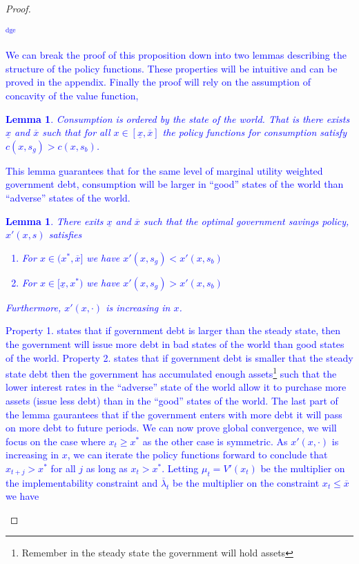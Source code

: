 \documentclass[12pt]{article}
\newcommand{\dge}[1]{\textcolor{blue}{$^{\textrm{dge}}${#1}}}
\newtheorem{lemma}[theorem]{Lemma}
\begin{document}
\begin{proof}  \dge{We can break the proof of this proposition down into two lemmas  describing the structure of the policy functions.  These properties will be intuitive and can be proved in the appendix.  Finally the proof will rely on the assumption of concavity of the value function,
\begin{lemma}\label{lem:c_order}  Consumption is ordered by the state of the world.  That is there exists $\underline x$ and $\overline x$ such that for all $x\in[\underline x,\overline x]$ the policy functions for consumption satisfy $c(x,s_g) > c(x,s_b)$.
\end{lemma}  This lemma guarantees that for the same level of marginal utility weighted government debt, consumption will be larger in ``good'' states of the world than ``adverse'' states of the world.
\begin{lemma}\label{lem:x_order}  There exits $\underline x$ and $\overline x$ such that the optimal government savings policy, $x'(x,s)$ satisfies 
\begin{enumerate}
	\item For $x\in(x^*,\overline x]$ we have $x'(x,s_g) < x'(x,s_b)$
	\item  For $x\in[\underline x, x^*)$ we have $x'(x,s_g) > x'(x,s_b)$
\end{enumerate}  Furthermore, $x'(x,\cdot)$ is increasing in $x$.
\end{lemma}  Property 1. states that if government debt is larger than the steady state, then the government will issue more debt in bad states of the world than good states of the world.  Property 2. states that if government debt is smaller that the steady state debt then the government has accumulated enough assets\footnote{Remember in the steady state the government will hold assets} such that the lower interest rates in the ``adverse'' state of the world allow it to purchase more assets (issue less debt) than in the ``good'' states of the world.   The last part of the lemma gaurantees that if the government enters with more debt it will pass on more debt to future periods.  We can now prove global convergence, we will focus on the case where $x_t \geq x^*$ as the other case is symmetric.  As $x'(x,\cdot)$ is increasing in $x$, we can iterate the policy functions forward to conclude that $x_{t+j} > x^*$ for all $j$ as long as $x_t >x ^*$.  Letting $\mu_t = V'(x_t)$ be the multiplier on the implementability constraint and $\overline \lambda_t$ be the multiplier on the constraint $x_t \leq \overline x$ we have
}
\end{proof}
\end{document}
